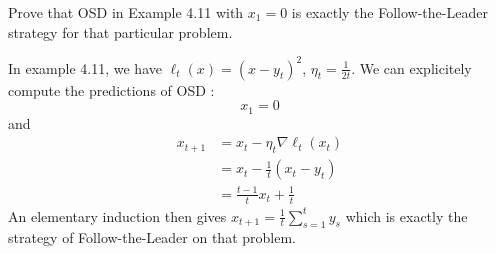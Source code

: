 \begin{exercise}[]{}
Prove that OSD in Example 4.11 with $ x_1 =0 $ is exactly the Follow-the-Leader strategy for that particular problem.
\end{exercise}

\begin{solution}[]
In example 4.11, we have $ \ell_t(x) = (x-y_t)^2$, $ \eta_t = \frac{1}{2t} $. We can explicitely compute the predictions of OSD :
\begin{equation*}
	x_1 =0
\end{equation*}
and
\begin{align*}
	x_{t+1} &= x_t - \eta_t \nabla \ell_t(x_t) \\
		&= x_t - \frac{1}{t}(x_t - y_t) \\
		&= \frac{t-1}{t}x_t + \frac{1}{t}
\end{align*}
An elementary induction then gives $ x_{t+1} = \frac{1}{t}\sum_{s=1}^{t}y_s $ which is exactly the strategy of Follow-the-Leader on that problem.
\end{solution}
